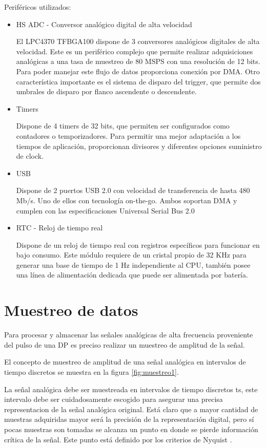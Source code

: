 Periféricos utilizados: 
\begin{itemize}

\item HS ADC - Conversor analógico digital de alta velocidad

El LPC4370 TFBGA100 dispone de 3 conversores analógicos digitales de alta velocidad. Este es un periférico complejo que permite realizar adquisiciones analógicas a una tasa de muestreo de 80 MSPS con una resolución de 12 bits. Para poder manejar este flujo de datos proporciona conexión por DMA. Otro característica importante es el sistema de disparo del trigger, que permite dos umbrales de disparo por flanco ascendente o descendente.

\item Timers

Dispone de 4 timers de 32 bits, que permiten ser configurados como contadores o temporizadores. Para permitir una mejor adaptación a los tiempos de aplicación, proporcionan divisores y diferentes opciones suministro de clock.


\item USB

Dispone de 2 puertos USB 2.0 con velocidad de transferencia de hasta 480 Mb/s. Uno de ellos con tecnología on-the-go. Ambos soportan DMA  y cumplen con las especificaciones Universal Serial Bus 2.0

\item RTC - Reloj de tiempo real

Dispone de un reloj de tiempo real con registros específicos para funcionar en bajo consumo. Este módulo requiere de un cristal propio de 32 KHz para generar una base de tiempo de 1 Hz independiente al CPU, también posee una línea de alimentación dedicada que puede ser alimentada por batería.
\end{itemize}


\section{Muestreo de datos}
Para procesar y almacenar las señales analógicas de alta frecuencia proveniente del pulso de una DP es preciso realizar un muestreo de amplitud de la señal. 

El concepto de muestreo de amplitud de una señal analógica en intervalos de tiempo discretos se muestra en la figura \ref{fig:muestreo1}.

La señal analógica debe ser muestreada en intervalos de tiempo discretos ts, este intervalo debe ser cuidadosamente escogido para asegurar una precisa representacion de la señal analógica original. Está claro que a mayor cantidad de muestras adquiridas mayor será la precisión de la representación digital, pero sí pocas muestras son tomadas se alcanza un punto en donde se pierde información crítica de la señal. Este punto está definido por los criterios de Nyquist \citep{sampling:appnote}.

